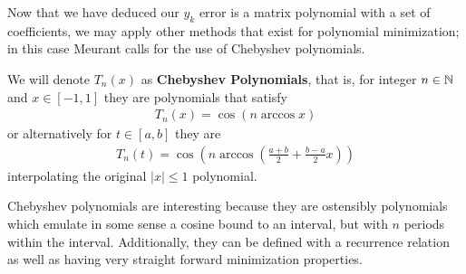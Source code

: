 \documentclass[11pt]{article}
\begin{document}
Now that we have deduced our $y_k$ error is a matrix polynomial with a set of coefficients, we may apply other methods that exist for polynomial minimization; in this case Meurant calls for the use of Chebyshev polynomials.

\begin{definition}
We will denote $T_n(x)$ as \textbf{Chebyshev Polynomials}, that is, for integer $n\in \mathbb{N}$ and $x \in [-1,1]$ they are polynomials that satisfy \begin{gather*}
T_n(x) = \cos (n \arccos x)
\end{gather*}
or alternatively for $t \in [a,b]$ they are\begin{gather*}
T_n(t) = \cos \left(n \arccos \left( \frac{a+b}{2} + \frac{b- a}{2} x\right) \right)
\end{gather*}
interpolating the original $|x| \le 1$ polynomial.
\end{definition}

Chebyshev polynomials are interesting because they are ostensibly polynomials which emulate in some sense a cosine bound to an interval, but with $n$ periods within the interval. Additionally, they can be defined with a recurrence relation as well as having very straight forward minimization properties.
\end{document}
